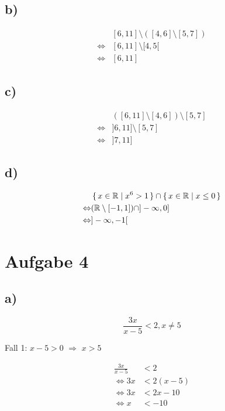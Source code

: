 \documentclass[a4paper, 11pt]{article}
\begin{document}
\subsection{b)}
\label{sec:org8e8dbc8}
\begin{align*}
    & [6, 11] \setminus ([4, 6] \setminus [5, 7]) \\
    \Leftrightarrow & [6, 11] \setminus [4, 5[ \\
    \Leftrightarrow & [6, 11]
\end{align*}

\subsection{c)}
\label{sec:org7379552}
\begin{align*}
    & ([6, 11] \setminus [4, 6]) \setminus [5, 7] \\
    \Leftrightarrow & ]6, 11] \setminus [5, 7] \\
    \Leftrightarrow & ]7, 11]
\end{align*}

\subsection{d)}
\label{sec:org6f178c6}
\begin{align*}
    & \set{x \in \mathbb{R} | x^6 > 1} \cap \set{x \in \mathbb{R} | x \leq 0} \\
    \Leftrightarrow & (\mathbb{R} \setminus [-1, 1]) \cap ]-\infty, 0] \\
    \Leftrightarrow & ]-\infty, -1[
\end{align*}

\section{Aufgabe 4}
\label{sec:orgd777c1c}
\subsection{a)}
\label{sec:org8eb68b9}
$$ \frac{3x}{x-5} < 2, x \neq 5 $$

Fall 1: \(x - 5 > 0\) \(\Rightarrow\) \(x > 5\)

\begin{align*}
    \frac{3x}{x-5} &< 2 \\
    \Leftrightarrow 3x &< 2(x-5) \\
    \Leftrightarrow 3x &< 2x-10 \\
    \Leftrightarrow x &< -10
\end{align*}
\end{document}
